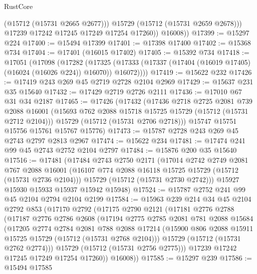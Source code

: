\begin{lexlean}{RustCore}
\begin{coremodule}
                (@15712 (@15731 @2665 @2677)))
              @15729
              (@15712 (@15731 @2659 @2678)))
            @17239
            @17242
            @17245
            @17249
            @17254
            @17260))
        @16008))
@17399 := @15297 @224
@17400 := @15494 @17399
@17401 := @17398 @17400
@17402 := @15368 @734
@17404 := @17401 (@16015 @17402)
@17405 := @15392 @734
@17418 := @17051
    (@17098
      (@17282
        (@17325 (@17333 (@17337 (@17404 (@16019 @17405) (@16024 (@16026 @224)) @16070)) @16072))))
@17419 := @15622 @232
@17426 := @17419 @243 @269 @45 @2719 @2728 @2104 @2969
@17429 := @15637 @231 @35 @15640
@17432 := @17429 @2719 @2726 @2111
@17436 := @17010 @67 @31 @34 @2187
@17465 := @17426
    (@17432
      (@17436
        @2718
        @2725
        @2081
        @739
        @2088
        @16001
        (@15693 @762 @2088 @15718 @15725 @15729 (@15712 (@15731 @2712 @2104)))
        @15729
        (@15712 (@15731 @2706 @2718)))
      @15747
      @15751
      @15756
      @15761
      @15767
      @15776)
@17473 := @15787 @2728 @243 @269 @45 @2743 @2797 @2813 @2967
@17474 := @15622 @234
@17481 := @17474 @241 @99 @45 @2743 @2752 @2104 @2797
@17484 := @15876 @200 @35 @15640
@17516 := @17481
    (@17484
      @2743
      @2750
      @2171
      (@17014
        @2742
        @2749
        @2081
        @767
        @2088
        @16001
        (@16107 @774 @2088 @16118 @15725 @15729 (@15712 (@15731 @2736 @2104)))
        @15729
        (@15712 (@15731 @2730 @2742)))
      @15927
      @15930
      @15933
      @15937
      @15942
      @15948)
@17524 := @15787 @2752 @241 @99 @45 @2104 @2794 @2104 @2199
@17584 := @15963
    @239
    @214
    @34
    @45
    @2104
    @2792
    @853
    (@17170
      @2792
      (@17175
        @2790
        @2121
        (@17181
          @2776
          @2788
          (@17187
            @2776
            @2786
            @2608
            (@17194
              @2775
              @2785
              @2081
              @781
              @2088
              @15684
              (@17205
                @2774
                @2784
                @2081
                @788
                @2088
                @17214
                (@15900 @806 @2088 @15911 @15725 @15729 (@15712 (@15731 @2768 @2104)))
                @15729
                (@15712 (@15731 @2762 @2774)))
              @15729
              (@15712 (@15731 @2756 @2775)))
            @17239
            @17242
            @17245
            @17249
            @17254
            @17260))
        @16008))
@17585 := @15297 @239
@17586 := @15494 @17585

\end{coremodule}
\end{lexlean}
